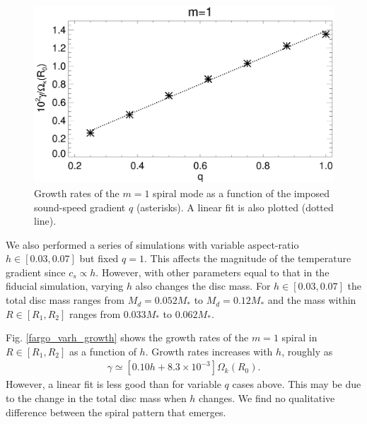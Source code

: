 \begin{figure}
  \includegraphics[width=\linewidth]{figures/m1_analysis_plot_ratemax_fargo_varq}    
  \caption{Growth rates of the $m=1$ spiral mode as a function of the
    imposed sound-speed gradient $q$ (asterisks). A linear fit is also 
    plotted (dotted line). 
    \label{fargo_varq_growth}} 
\end{figure}

We also performed a series of simulations with variable aspect-ratio 
$h\in[0.03,0.07]$ but fixed $q=1$. This affects the magnitude of the temperature
gradient since $c_s \propto h$. However, with other parameters equal
to that in the fiducial simulation,  varying $h$ also changes the disc
mass. For $h\in[0.03,0.07]$ the total disc mass ranges from
$M_d=0.052M_*$ to $M_d=0.12M_*$ and the 
mass within $R\in[R_1,R_2]$  ranges from $0.033M_*$ to $0.062M_*$. 

Fig. \ref{fargo_varh_growth} shows the growth rates of the $m=1$
spiral in $R\in[R_1,R_2]$ as a function of $h$. Growth rates increases
with $h$, roughly as  
\begin{align*}
  \gamma \simeq \left[0.10h + 8.3\times10^{-3}\right]\Omega_k(R_0).  
\end{align*}
However, a linear fit is less good than for variable $q$ cases above. This
may be due to the change in the total disc mass when $h$ changes. We
find no qualitative difference between the spiral pattern that
emerges. 

